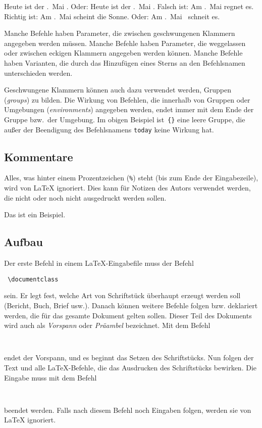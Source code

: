 \begin{LTXexample}[firstline=4]
\renewcommand*\today{%
  \the\numexpr{}\relax.~Mai \the\year}
\obeylines
Heute ist der \today.
Oder: Heute ist der \today .
Falsch ist:
 Am \today regnet es.
Richtig ist:
 Am \today{} scheint die Sonne.
 Oder: Am \today\ schneit es.
\end{LTXexample}



Manche Befehle haben Parameter, die zwischen geschwungenen Klammern angegeben
werden müssen. Manche Befehle haben Parameter, die weggelassen oder zwischen
eckigen Klammern angegeben werden können. Manche Befehle haben Varianten, die
durch das Hinzufügen eines Sterns an den Befehlsnamen unterschieden werden.

Geschwungene Klammern können auch dazu verwendet werden, Gruppen (\emph{groups})
zu bilden. Die Wirkung von Befehlen, die innerhalb von Gruppen oder Umgebungen
(\emph{environments}) angegeben werden, endet immer mit dem Ende der Gruppe
bzw.\ der Umgebung.  Im obigen Beispiel ist~\lstinline|{}| eine leere Gruppe, die
außer der Beendigung des Befehlsnamens \texttt{today} keine Wirkung hat.

\subsection{Kommentare}

Alles, was hinter einem Prozentzeichen (\lstinline|%|) steht (bis zum Ende der
Eingabezeile), wird von \LaTeX{} ignoriert. Dies kann für Notizen des Autors
verwendet werden, die nicht oder noch nicht ausgedruckt werden sollen.
\begin{LTXexample}
Das ist ein %
Beispiel.
\end{LTXexample}

\subsection{Aufbau}

Der erste Befehl in einem \LaTeX-Eingabefile muss der Befehl
\begin{lstlisting}
 \documentclass
\end{lstlisting}
sein. Er legt fest, welche Art von Schriftstück überhaupt erzeugt werden soll
(Bericht, Buch, Brief usw.). Danach können weitere Befehle folgen bzw.
deklariert werden, die für das gesamte Dokument gelten sollen.  Dieser Teil des
Dokuments wird auch als \emph{Vorspann} oder \emph{Präambel} bezeichnet. Mit dem
Befehl
\begin{lstlisting}
 
\end{lstlisting}
endet der Vorspann, und es beginnt das Setzen des Schriftstücks. Nun folgen der
Text und alle \LaTeX-Befehle, die das Ausdrucken des Schriftstücks bewirken.
Die Eingabe muss mit dem Befehl
\begin{lstlisting}
 
\end{lstlisting}
beendet werden. Falls nach diesem Befehl noch Eingaben folgen, werden sie von
\LaTeX{} ignoriert.

